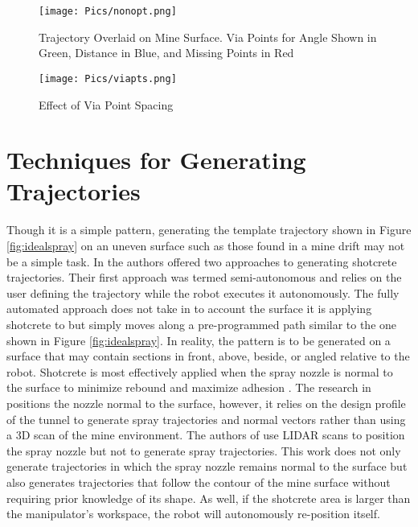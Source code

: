 \begin{figure}[h]
    \centering
    \texttt{[image: Pics/nonopt.png]}
    \caption{Trajectory Overlaid on Mine Surface. Via Points for Angle Shown in Green, Distance in Blue, and Missing Points in Red}
    \label{fig:unidealspray}
\end{figure}

\begin{figure}[h]
    \centering
    \texttt{[image: Pics/viapts.png]}
    \caption{Effect of Via Point Spacing}
    \label{fig:viapts}
\end{figure}

\section{Techniques for Generating Trajectories}
Though it is a simple pattern, generating the template trajectory shown in Figure \ref{fig:idealspray} on an uneven surface such as those found in a mine drift may not be a simple task. In \cite{fully} the authors offered two approaches to generating shotcrete trajectories. Their first approach was termed semi-autonomous and relies on the user defining the trajectory while the robot executes it autonomously. The fully automated approach does not take in to account the surface it is applying shotcrete to but simply moves along a pre-programmed path similar to the one shown in Figure \ref{fig:idealspray}. In reality, the pattern is to be generated on a surface that may contain sections in front, above, beside, or angled relative to the robot. Shotcrete is most effectively applied when the spray nozzle is normal to the surface to minimize rebound and maximize adhesion \cite{spraypat}. The research in \cite{steal} positions the nozzle normal to the surface, however, it relies on the design profile of the tunnel to generate spray trajectories and normal vectors rather than using a 3D scan of the mine environment. The authors of \cite{artd} use LIDAR scans to position the spray nozzle but not to generate spray trajectories. This work does not only generate trajectories in which the spray nozzle remains normal to the surface but also generates trajectories that follow the contour of the mine surface without requiring prior knowledge of its shape. As well, if the shotcrete area is larger than the manipulator's workspace, the robot will autonomously re-position itself.\\

